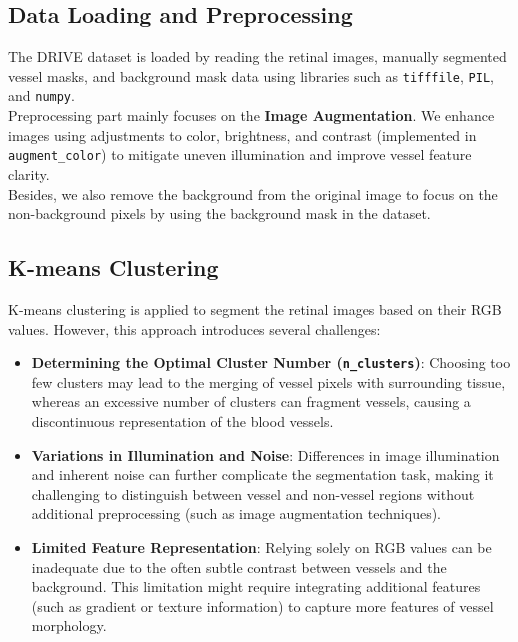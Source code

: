 \documentclass[12pt,letterpaper]{article}
\begin{document}
\subsection{Data Loading and Preprocessing}
The DRIVE dataset is loaded by reading the retinal images, manually segmented vessel masks, and background mask data using libraries such as \texttt{tifffile}, \texttt{PIL}, and \texttt{numpy}. \\
Preprocessing part mainly focuses on the \textbf{Image Augmentation}. We enhance images using adjustments to color, brightness, and contrast (implemented in \texttt{augment\_color}) to mitigate uneven illumination and improve vessel feature clarity. \\
Besides, we also remove the background from the original image to focus on the non-background pixels by using the background mask in the dataset. 

\subsection{K-means Clustering}
K-means clustering is applied to segment the retinal images based on their RGB values. However, this approach introduces several challenges:
\begin{itemize}
    \item \textbf{Determining the Optimal Cluster Number (\texttt{n\_clusters})}: Choosing too few clusters may lead to the merging of vessel pixels with surrounding tissue, whereas an excessive number of clusters can fragment vessels, causing a discontinuous representation of the blood vessels.
    \item \textbf{Variations in Illumination and Noise}: Differences in image illumination and inherent noise can further complicate the segmentation task, making it challenging to distinguish between vessel and non-vessel regions without additional preprocessing (such as image augmentation techniques).
    \item \textbf{Limited Feature Representation}: Relying solely on RGB values can be inadequate due to the often subtle contrast between vessels and the background. This limitation might require integrating additional features (such as gradient or texture information) to capture more features of vessel morphology.
\end{itemize}
\end{document}
